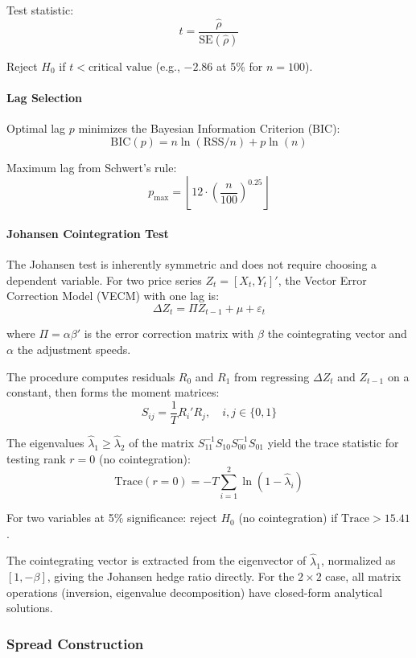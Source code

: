 Test statistic:
\[
t = \frac{\hat{\rho}}{\text{SE}(\hat{\rho})}
\]

Reject $H_0$ if $t < \text{critical value}$ (e.g., $-2.86$ at 5\% for $n = 100$).

\paragraph{Lag Selection}

Optimal lag $p$ minimizes the Bayesian Information Criterion (BIC):
\[
\text{BIC}(p) = n \ln(\text{RSS}/n) + p \ln(n)
\]

Maximum lag from Schwert's rule:
\[
p_{\max} = \left\lfloor 12 \cdot \left(\frac{n}{100}\right)^{0.25} \right\rfloor
\]

\paragraph{Johansen Cointegration Test}

The Johansen test is inherently symmetric and does not require choosing a dependent variable. For two price series $Z_t = [X_t, Y_t]'$, the Vector Error Correction Model (VECM) with one lag is:
\[
\Delta Z_t = \Pi Z_{t-1} + \mu + \varepsilon_t
\]

where $\Pi = \alpha \beta'$ is the error correction matrix with $\beta$ the cointegrating vector and $\alpha$ the adjustment speeds.

The procedure computes residuals $R_0$ and $R_1$ from regressing $\Delta Z_t$ and $Z_{t-1}$ on a constant, then forms the moment matrices:
\[
S_{ij} = \frac{1}{T} R_i' R_j, \quad i,j \in \{0, 1\}
\]

The eigenvalues $\hat{\lambda}_1 \geq \hat{\lambda}_2$ of the matrix $S_{11}^{-1} S_{10} S_{00}^{-1} S_{01}$ yield the trace statistic for testing rank $r = 0$ (no cointegration):
\[
\text{Trace}(r=0) = -T \sum_{i=1}^{2} \ln(1 - \hat{\lambda}_i)
\]

For two variables at 5\% significance: reject $H_0$ (no cointegration) if $\text{Trace} > 15.41$.

The cointegrating vector is extracted from the eigenvector of $\hat{\lambda}_1$, normalized as $[1, -\beta]$, giving the Johansen hedge ratio directly. For the $2 \times 2$ case, all matrix operations (inversion, eigenvalue decomposition) have closed-form analytical solutions.

\subsubsection{Spread Construction}

